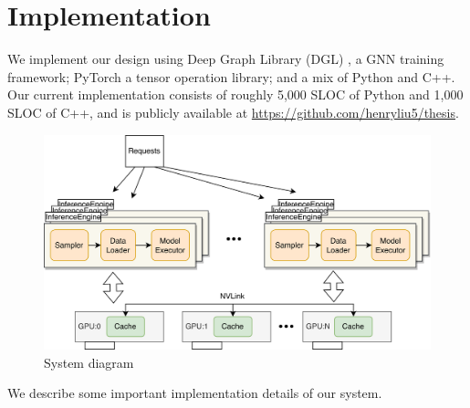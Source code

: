 \chapter{Implementation}
We implement our design using Deep Graph Library (DGL) \cite{DGL_2019}, a GNN training framework; PyTorch \cite{PyTorch_2019} a tensor operation library; and a mix of Python and C++.
Our current implementation consists of roughly 5,000 SLOC of Python and 1,000 SLOC of C++, and is publicly available at \url{https://github.com/henryliu5/thesis}.
\begin{figure}[h!]
    \centering
    \includegraphics[width=\textwidth]{diagrams/group_meeting_gnn-System Diagram.png}
    
    \caption{System diagram}
    \label{Our system diagram}
\end{figure} 
We describe some important implementation details of our system.
